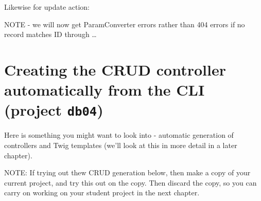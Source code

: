 \documentclass[a4paperpaper,openright]{book}
\newenvironment{Shaded}{}{}
\newcommand{\AnnotationTok}[1]{\textcolor[rgb]{0.38,0.63,0.69}{\textbf{\textit{#1}}}}
\newcommand{\CommentTok}[1]{\textcolor[rgb]{0.38,0.63,0.69}{\textit{#1}}}
\newcommand{\FunctionTok}[1]{\textcolor[rgb]{0.02,0.16,0.49}{#1}}
\newcommand{\KeywordTok}[1]{\textcolor[rgb]{0.00,0.44,0.13}{\textbf{#1}}}
\newcommand{\NormalTok}[1]{#1}
\newcommand{\OtherTok}[1]{\textcolor[rgb]{0.00,0.44,0.13}{#1}}
\newcommand{\StringTok}[1]{\textcolor[rgb]{0.25,0.44,0.63}{#1}}
\begin{document}
Likewise for update action:

\begin{Shaded}
\end{Shaded}

NOTE - we will now get ParamConverter errors rather than 404 errors if
no record matches ID through \ldots{}

\hypertarget{creating-the-crud-controller-automatically-from-the-cli-project-db04}{%
\section{\texorpdfstring{Creating the CRUD controller automatically from
the CLI (project
\texttt{db04})}{Creating the CRUD controller automatically from the CLI (project db04)}}\label{creating-the-crud-controller-automatically-from-the-cli-project-db04}}

Here is something you might want to look into - automatic generation of
controllers and Twig templates (we'll look at this in more detail in a
later chapter).

NOTE: If trying out thew CRUD generation below, then make a copy of your
current project, and try this out on the copy. Then discard the copy, so
you can carry on working on your student project in the next chapter.
\end{document}
